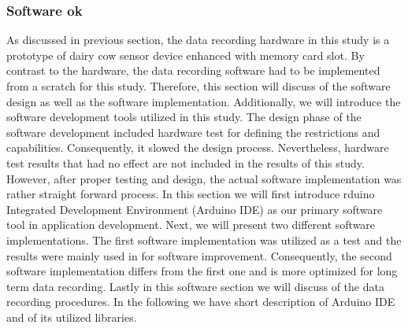 \documentclass[english,12pt,a4paper,pdftex,elec,utf8]{aaltothesis}
\begin{document}



\subsubsection{Software ok} \label{softwaresection}

As discussed in previous section, the data recording hardware in this study is a prototype of dairy cow sensor device enhanced with memory card slot. By contrast to the hardware, the data recording software had to be implemented from a scratch for this study. Therefore, this section will discuss of the software design as well as the software implementation.  Additionally, we will introduce the software development tools utilized in this study. The design phase of the software development included hardware test for defining the restrictions and capabilities. Consequently, it slowed the design process. Nevertheless, hardware test results that had no effect are not included in the results of this study. However, after proper testing and design, the actual software implementation was rather straight forward process. In this section we will first introduce rduino Integrated Development Environment (Arduino IDE) \cite{arduinoide} as our primary software tool in application development. Next, we will present two different software implementations. The first software implementation was utilized as a test and the results were mainly used in for software improvement. Consequently, the second software implementation differs from the first one and is more optimized for long term data recording. Lastly in this software section we will discuss of the data recording procedures. In the following we have short description of Arduino IDE and of its utilized libraries.
\end{document}
